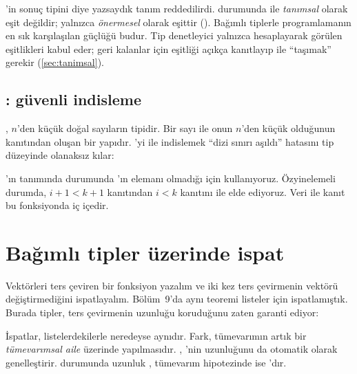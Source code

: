 
\begin{dikkat}
'in sonuç tipini  diye yazsaydık
tanım reddedilirdi.  durumunda  ile 
\emph{tanımsal} olarak eşit değildir; yalnızca \emph{önermesel} olarak
eşittir (). Bağımlı tiplerle programlamanın en sık
karşılaşılan güçlüğü budur. Tip denetleyici yalnızca hesaplayarak görülen
eşitlikleri kabul eder; geri kalanlar için eşitliği açıkça kanıtlayıp
 ile ``taşımak'' gerekir (\cref{sec:tanimsal}).
\end{dikkat}

\subsection{: güvenli indisleme}

, $n$'den küçük doğal sayıların tipidir. Bir sayı ile onun $n$'den
küçük olduğunun kanıtından oluşan bir yapıdır. 'yi 
ile indislemek ``dizi sınırı aşıldı'' hatasını tip düzeyinde olanaksız
kılar:


\noindent {}'ın tanımında  durumunda 'ın elemanı
olmadığı için  kullanıyoruz. Özyinelemeli durumda, $i + 1 <
k + 1$ kanıtından $i < k$ kanıtını  ile
elde ediyoruz. Veri ile kanıt bu fonksiyonda iç içedir.

\section{Bağımlı tipler üzerinde ispat}\label{sec:bagimli-ispat}

Vektörleri ters çeviren bir fonksiyon yazalım ve iki kez ters
çevirmenin vektörü değiştirmediğini ispatlayalım. Bölüm~9'da aynı teoremi
listeler için ispatlamıştık. Burada tipler, ters çevirmenin uzunluğu
koruduğunu zaten garanti ediyor:


\noindent İspatlar, listelerdekilerle neredeyse aynıdır. Fark, tümevarımın
artık bir \emph{tümevarımsal aile} üzerinde yapılmasıdır. 
, 'nin uzunluğunu da otomatik olarak genelleştirir. 
durumunda uzunluk , tümevarım hipotezinde ise 'dır.

